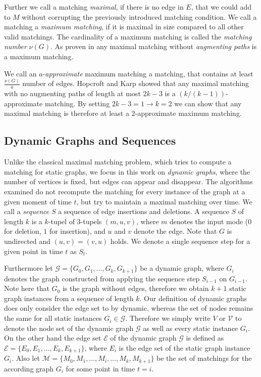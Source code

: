 \documentclass{article}      %
\begin{document}
Further we call a matching \emph{maximal}, if there is no edge in $E$, that we could add to $M$ without corrupting the previously introduced matching condition. We call a matching a \emph{maximum matching}, if it is maximal in size compared to all other valid matchings. The cardinality of a maximum matching is called the \emph{matching number} $\nu(G)$. As proven in \cite{berge57} any maximal matching without \emph{augmenting paths} is a maximum matching. 

We call an $a$-\emph{approximate} maximum matching a matching, that contains at least $\frac{\nu(G)}{a}$ number of edges. Hopcroft and Karp \cite{hopkarp71} showed that any maximal matching with no augmenting paths of length at most $2k-3$ is a $(k/(k-1))$-approximate matching. By setting $2k-3=1 \to k = 2$ we can show that any maximal matching is therefore at least a $2$-approximate maximum matching.

\subsection{Dynamic Graphs and Sequences}
\label{sec:dyn-graphs-seqs}

Unlike the classical maximal matching problem, which tries to compute a matching for static graphs, we focus in this work on \emph{dynamic graphs}, where the number of vertices is fixed, but edges can appear and disappear. The algorithms examined do not recompute the matching for every instance of the graph at a given moment of time $t$, but try to maintain a maximal matching over time. We call a \emph{sequence} $S$ a sequence of edge insertions and deletions. A sequence $S$ of length $k$ is a $k$-tupel of $3$-tupels $(m,u,v)$, where $m$ denotes the input mode ($0$ for deletion, $1$ for insertion), and $u$ and $v$ denote the edge. Note that $G$ is undirected and $(u,v)=(v,u)$ holds. We denote a single sequence step for a given point in time $t$ as $S_t$. 

Furthermore let $\mathcal{G}=\{G_0, G_1,\dots, G_k, G_{k+1}\}$ be a dynamic graph, where $G_i$ denotes the graph constructed from applying the sequence step $S_{i-1}$ on $G_{i-1}$. Note here that $G_0$ is the graph without edges, therefore we obtain $k+1$ static graph instances from a sequence of length $k$. Our definition of dynamic graphs does only consider the edge set to by dynamic, whereas the set of nodes remains the same for all static instances $G_i \in \mathcal{G}$. Therefore we simply write $V$ or $\mathcal{V}$ to denote the node set of the dynamic graph $\mathcal{G}$ as well as every static instance $G_i$. On the other hand the edge set $\mathcal{E}$ of the dynamic graph $\mathcal{G}$ is defined as $\mathcal{E}=\{ E_0, E_1, \dots, E_k, E_{k+1} \} $, where $E_i$ is the edge set of the static graph instance $G_i$. Also let $\mathcal{M}=\{M_0, M_1,\dots, M_i,\dots, M_k, M_{k+1}\}$ be the set of matchings for the according graph $G_i$ for some point in time $t=i$.
\end{document}

